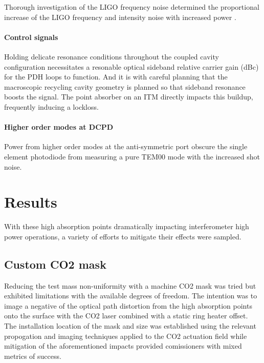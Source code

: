 Thorough investigation of the LIGO frequency noise determined the proportional increase of the LIGO frequency and intensity noise with increased power \cite{buikema:2020}.

\paragraph{Control signals}
Holding delicate resonance conditions throughout the coupled cavity configuration necessitates a resonable optical sideband relative carrier gain (dBc) for the PDH loops to function. And it is with careful planning that the macroscopic recycling cavity geometry is planned so that sideband resonance boosts the signal. The point absorber on an ITM directly impacts this buildup, frequently inducing a lockloss. 



\paragraph{Higher order modes at DCPD}
Power from higher order modes at the anti-symmetric port obscure the single element photodiode from measuring a pure TEM00 mode with the increased shot noise. 

\section{Results}
With these high absorption points dramatically impacting interferometer high power operations, a variety of efforts to mitigate their effects were sampled.

\subsection{Custom CO2 mask}
Reducing the test mass non-uniformity with a machine CO2 mask \cite{appendix:CO2mask} was tried but exhibited limitations with the available degrees of freedom. The intention was to image a negative of the optical path distortion from the high absorption points onto the surface with the CO2 laser combined with a static ring heater offset. The installation location of the mask and size was established using the relevant propogation and imaging techniques applied to the CO2 actuation field while mitigation of the aforementioned impacts provided comissioners with mixed metrics of success.

